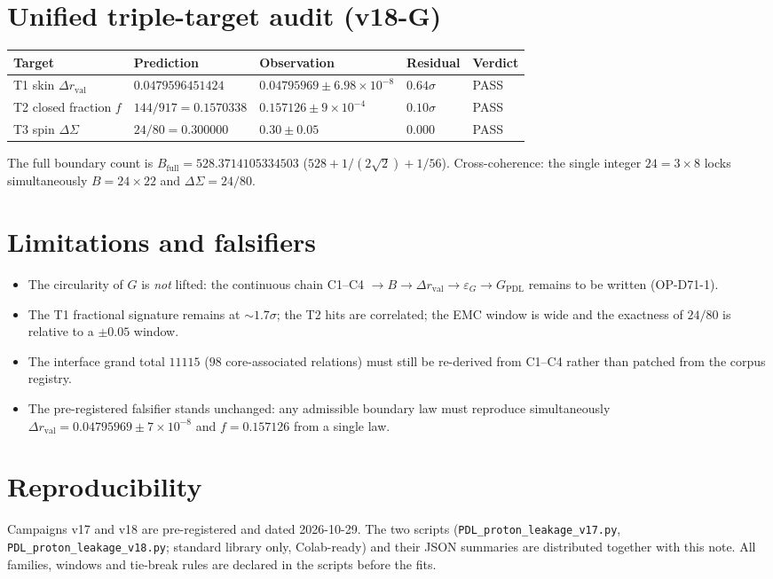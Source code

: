 \documentclass[11pt,a4paper]{article}
\newcommand{\Dr}{\Delta r_{\mathrm{val}}}
\begin{document}
\section{Unified triple-target audit (v18-G)}
\begin{table}[h]
\centering\small
\begin{tabular}{lllll}
\toprule
Target & Prediction & Observation & Residual & Verdict \\
\midrule
T1 skin $\Dr$ & $0.0479596451424$ & $0.04795969 \pm 6.98\times10^{-8}$ & $0.64\sigma$ & PASS \\
T2 closed fraction $f$ & $144/917 = 0.1570338$ & $0.157126 \pm 9\times10^{-4}$ & $0.10\sigma$ & PASS \\
T3 spin $\Delta\Sigma$ & $24/80 = 0.300000$ & $0.30 \pm 0.05$ & $0.000$ & PASS \\
\bottomrule
\end{tabular}
\end{table}
The full boundary count is $B_{\mathrm{full}} = 528.3714105334503$ ($528 + 1/(2\sqrt{2}) + 1/56$). Cross-coherence: the single integer $24 = 3 \times 8$ locks simultaneously $B = 24 \times 22$ and $\Delta\Sigma = 24/80$.

\section{Limitations and falsifiers}\label{sec:limits}
\begin{itemize}[leftmargin=1.6em]
\item The circularity of $G$ is \emph{not} lifted: the continuous chain C1--C4 $\to B \to \Dr \to \varepsilon_G \to G_{\mathrm{PDL}}$ remains to be written (OP-D71-1).
\item The T1 fractional signature remains at $\sim 1.7\sigma$; the T2 hits are correlated; the EMC window is wide and the exactness of $24/80$ is relative to a $\pm 0.05$ window.
\item The interface grand total $11115$ ($98$ core-associated relations) must still be re-derived from C1--C4 rather than patched from the corpus registry.
\item The pre-registered falsifier stands unchanged: any admissible boundary law must reproduce simultaneously $\Dr = 0.04795969 \pm 7\times10^{-8}$ and $f = 0.157126$ from a single law.
\end{itemize}

\section{Reproducibility}
Campaigns v17 and v18 are pre-registered and dated 2026-10-29. The two scripts (\texttt{PDL\_proton\_leakage\_v17.py}, \texttt{PDL\_proton\_leakage\_v18.py}; standard library only, Colab-ready) and their JSON summaries are distributed together with this note. All families, windows and tie-break rules are declared in the scripts before the fits.
\end{document}
